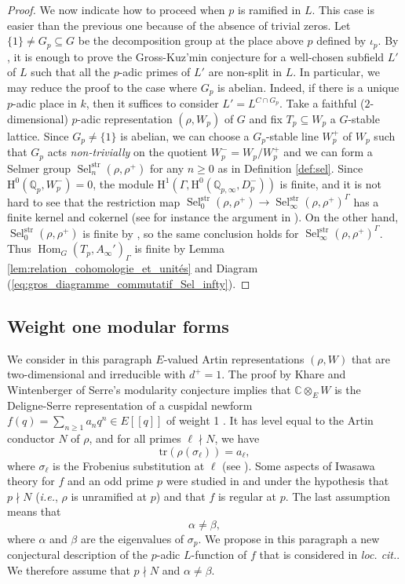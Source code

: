 \documentclass[12pt]{amsart}
\newcommand\bC{\mathbb{C}}
\newcommand\bQ{\mathbb{Q}}
\newcommand\Qp{{\mathbb{Q}_p}}
\newcommand{\str}{\mathrm{str}}
\DeclareMathOperator{\Hom}{Hom}
\DeclareMathOperator{\Sel}{Sel}
\newcommand{\HH}{\mathrm{H}}
\theoremstyle{defstyle}
\theoremstyle{thmstyle}
\begin{document}
\begin{proof}
We now indicate how to proceed when $p$ is ramified in $L$. This case is easier than the previous one because of the absence of trivial zeros. Let $\{1\}\neq G_p \subseteq G$ be the decomposition group at the place above $p$ defined by $\iota_p$. By \cite[Preuve du corollaire]{jaulent2003}, it is enough to prove the Gross-Kuz'min conjecture for a well-chosen subfield $L'$ of $L$ such that all the $p$-adic primes of $L'$ are non-split in $L$. In particular, we may reduce the proof to the case where $G_p$ is abelian. Indeed, if there is a unique $p$-adic place in $k$, then it suffices to consider $L'=L^{C\cap G_p}$. Take a faithful ($2$-dimensional) $p$-adic representation $(\rho,W_p)$ of $G$ and fix $T_p\subseteq W_p$ a $G$-stable lattice. Since $G_p\neq \{1\}$ is abelian, we can choose a $G_p$-stable line $W_p^+$ of $W_p$ such that $G_p$ acts \emph{non-trivially} on the quotient $W_p^-=W_p/W_p^+$ and we can form a Selmer group $\Sel^\str_n(\rho,\rho^+)$ for any $n\geq 0$ as in Definition \ref{def:sel}. Since $\HH^0(\Qp,W_p^-)=0$, the module $\HH^1(\Gamma,\HH^0(\bQ_{p,\infty},D_p^-))$ is finite, and it is not hard to see that the restriction map $\Sel^\str_0(\rho,\rho^+) \longrightarrow \Sel^\str_\infty(\rho,\rho^+)^\Gamma$ has a finite kernel and cokernel (see for instance the argument in \cite[Lemme 2.2.2]{maks}). On the other hand, $\Sel^\str_0(\rho,\rho^+)$ is finite by \cite[Thm. 2.4.7]{maks}, so the same conclusion holds for $\Sel^\str_\infty(\rho,\rho^+)^\Gamma$. Thus $\Hom_G(T_p,A_\infty')_\Gamma$ is finite by Lemma \ref{lem:relation_cohomologie_et_unités} and Diagram (\ref{eq:gros_diagramme_commutatif_Sel_infty}).
\end{proof}
 
\subsection{Weight one modular forms}\label{sec:weight_one}
We consider in this paragraph $E$-valued Artin representations $(\rho,W)$ that are two-dimensional and irreducible with $d^+=1$. The proof by Khare and Wintenberger of Serre's modularity conjecture implies that $\bC \otimes_E W$ is the Deligne-Serre representation of a cuspidal newform $f(q)=\sum_{n\geq 1}a_nq^n\in E[[q]]$ of weight 1 \cite[Cor. 10.2 (ii)]{kharewintenberger}. It has level equal to the Artin conductor $N$ of $\rho$, and for all primes $\ell \nmid N$, we have 
\[ \textrm{tr}(\rho(\sigma_\ell))=a_\ell, \]
where $\sigma_\ell$ is the Frobenius substitution at $\ell$ (see \cite{deligne1974formes}). Some aspects of Iwasawa theory for $f$ and an odd prime $p$ were studied in \cite{maks} and \cite{GV2020} under the hypothesis that $p\nmid N$ (\textit{i.e.}, $\rho$ is unramified at $p$) and that $f$ is regular at $p$. The last assumption means that
\[\alpha\neq \beta,\]
where $\alpha$ and $\beta$ are the eigenvalues of $\sigma_p$. We propose in this paragraph a new conjectural description of the $p$-adic $L$-function of $f$ that is considered in \textit{loc. cit.}. We therefore assume that $p\nmid N$ and $\alpha\neq \beta$. 
\end{document}
